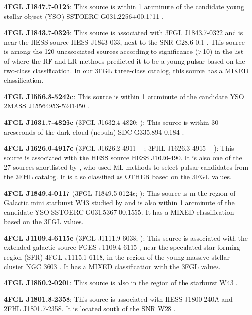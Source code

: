 \documentclass[referee]{aa} %
\begin{document}
\textbf{4FGL J1847.7-0125}: This source is within 1 arcminute of the candidate young stellar object (YSO) SSTOERC G031.2256+00.1711 \citep{2017ApJ...839..108S}.

\textbf{4FGL J1843.7-0326}: This source is associated with 3FGL J1843.7-0322 and is near the HESS source HESS J1843-033, next to the SNR G28.6-0.1 \citep{2018A&A...612A...1H}. This source is
among the 120 unassociated sources according to significance (>10) in the list of \citet{2016ApJ...820....8S} where the RF and LR methods predicted it to be a young pulsar based on the two-class classification. 
In our 3FGL three-class catalog, this source has a MIXED classification.

\textbf{4FGL J1556.8-5242c}: This source is within 1 arcminute of the candidate YSO 2MASS J15564953-5241450 \citep{2008AJ....136.2413R}.

\textbf{4FGL J1631.7-4826c} (3FGL J1632.4-4820; \citealt{2015ApJS..218...23A}): This source is within 30 arcseconds of the dark cloud (nebula) SDC G335.894-0.184 \citep{2016A&A...590A..72P}.

\textbf{4FGL J1626.0-4917c} (3FGL J1626.2-4911 -- \citealt{2015ApJS..218...23A}; 3FHL J1626.3-4915 -- \citealt{2017ApJS..232...18A}): 
This source is associated with the HESS source HESS J1626-490. It is also one of the 27 sources shortlisted by \citet{2020MNRAS.495.1093H}, 
who used ML methods to select pulsar candidates from the 3FHL catalog. It is also classified as OTHER based on the 3FGL values.

\textbf{4FGL J1849.4-0117} (3FGL J1849.5-0124c; \citealt{2015ApJS..218...23A}): This source is in the region of Galactic mini starburst W43 studied by \citet{2020A&A...640A..60Y} and is also within 1 arcminute of the candidate YSO SSTOERC G031.5367-00.1555. It has a MIXED classification based on the 3FGL values.

\textbf{4FGL J1109.4-6115e} (3FGL J1111.9-6038; \citealt{2015ApJS..218...23A}): This source is associated with the extended galactic source FGES J1109.4-6115 \citep{2017ApJ...843..139A}, near the speculated star forming region (SFR) 4FGL J1115.1-6118, in the region of the young massive stellar cluster NGC 3603 \citep{2020ApJ...897..131S}. It has a MIXED classification with the 3FGL values.

\textbf{4FGL J1850.2-0201}: This source is also in the region of the starburst W43 \citep{2020A&A...640A..60Y}.

\textbf{4FGL J1801.8-2358}: This source is associated with HESS J1800-240A and 2FHL J1801.7-2358. It is located south of the SNR W28 \citep{2020MNRAS.495.2909R}.
\end{document}
